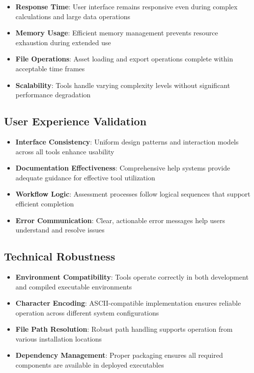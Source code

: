 \documentclass[binding=0.6cm]{sapthesis}
\begin{document}
\begin{itemize}
    \item \textbf{Response Time}: User interface remains responsive even during complex calculations and large data operations
    \item \textbf{Memory Usage}: Efficient memory management prevents resource exhaustion during extended use
    \item \textbf{File Operations}: Asset loading and export operations complete within acceptable time frames
    \item \textbf{Scalability}: Tools handle varying complexity levels without significant performance degradation
\end{itemize}

\subsection{User Experience Validation}

\begin{itemize}
    \item \textbf{Interface Consistency}: Uniform design patterns and interaction models across all tools enhance usability
    \item \textbf{Documentation Effectiveness}: Comprehensive help systems provide adequate guidance for effective tool utilization
    \item \textbf{Workflow Logic}: Assessment processes follow logical sequences that support efficient completion
    \item \textbf{Error Communication}: Clear, actionable error messages help users understand and resolve issues
\end{itemize}

\subsection{Technical Robustness}

\begin{itemize}
    \item \textbf{Environment Compatibility}: Tools operate correctly in both development and compiled executable environments
    \item \textbf{Character Encoding}: ASCII-compatible implementation ensures reliable operation across different system configurations
    \item \textbf{File Path Resolution}: Robust path handling supports operation from various installation locations
    \item \textbf{Dependency Management}: Proper packaging ensures all required components are available in deployed executables
\end{itemize}
\end{document}
